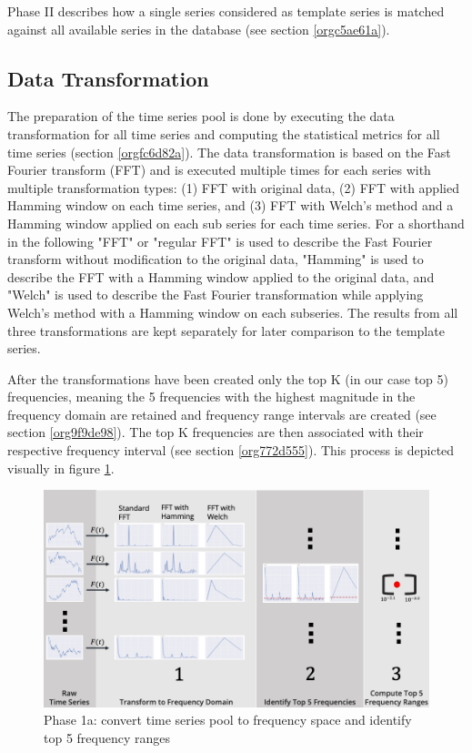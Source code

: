 \documentclass[phd,black, hidelinks]{PrincetonThesis}
\begin{document}
Phase II describes how a single series considered as template series is matched against all available series in the database (see section \ref{orgc5ae61a}).

\subsection{Data Transformation}
\label{sec:org748bb69}
\label{orge0cee10}
The preparation of the time series pool is done by executing the data transformation for all time series and computing the statistical metrics for all time series (section \ref{orgfc6d82a}). The data transformation is based on the Fast Fourier transform (FFT) and is executed multiple times for each series with multiple transformation types: (1) FFT with original data, (2) FFT with applied Hamming window on each time series, and (3) FFT with Welch's method and a Hamming window applied on each sub series for each time series. For a shorthand in the following "FFT" or "regular FFT" is used to describe the Fast Fourier transform without modification to the original data, "Hamming" is used to describe the FFT with a Hamming window applied to the original data, and "Welch" is used to describe the Fast Fourier transformation while applying Welch's method with a Hamming window on each subseries. The results from all three transformations are kept separately for later comparison to the template series.

After the transformations have been created only the top K (in our case top 5) frequencies, meaning the 5 frequencies with the highest magnitude in the frequency domain are retained and frequency range intervals are created (see section \ref{org9f9de98}). The top K frequencies are then associated with their respective frequency interval (see section \ref{org772d555}). This process is depicted visually in figure \ref{fig:org6a49405}.

\begin{figure}[htbp]
\centering
\includegraphics[width=.9\linewidth]{./img/process_fft.png}
\caption{\label{fig:org6a49405}Phase 1a: convert time series pool to frequency space and identify top 5 frequency ranges}
\end{figure}
\end{document}
